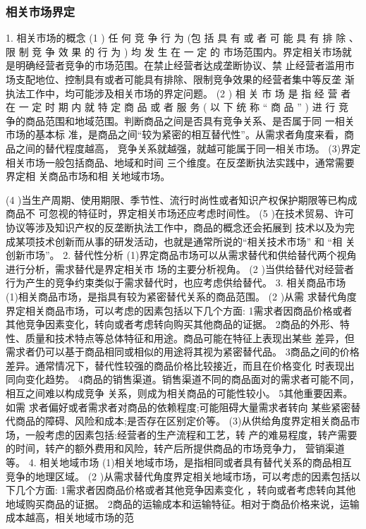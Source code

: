 \documentclass[UTF8,12pt]{ctexart}
\numberwithin{equation}{section} %
\numberwithin{figure}{section}
\numberwithin{table}{section}
\begin{document}
	\subsubsection{相关市场界定}
	1. 相关市场的概念
	(1 ) 任 何 竞 争 行 为 (包 括 具 有 或 者 可 能 具 有 排 除 、 限 制 竞 争 效 果 的 行 为 ) 均 发 生 在 一 定 的
	市场范围内。界定相关市场就是明确经营者竞争的市场范围。在禁止经营者达成垄断协议、禁
	止经营者滥用市场支配地位、控制具有或者可能具有排除、限制竞争效果的经营者集中等反垄
	渐执法工作中，均可能涉及相关市场的界定问题。
	(2 ) 相 关 市 场 是 指 经 营 者 在 一 定 时 期 内 就 特 定 商 品 或 者 服 务 ( 以 下 统 称 “ 商 品 ” ) 进 行 竞
	争的商品范围和地域范围。判断商品之间是否具有竞争关系、是否属于同 一相关市场的基本标
	准，是商品之间“较为紧密的相互替代性”。从需求者角度来看，商品之间的替代程度越高，
	竞争关系就越强，就越可能属于同一相关市场。
	(3)界定相关市场一般包括商品、地域和时间 三个维度。在反垄断执法实践中，通常需要
	界定相 关商品市场和相 关地域市场。
	
	
	(4 )当生产周期、使用期限、季节性、流行时尚性或者知识产权保护期限等已构成商品不
	可忽视的特征时，界定相关市场还应考虑时间性。
	(5 )在技术贸易、许可协议等涉及知识产权的反垄断执法工作中，商品的概念还会拓展到
	技术以及为完成某项技术创新而从事的研发活动，也就是通常所说的“相关技术市场” 和 “相
	关创新市场”。
	2. 替代性分析
	(1)界定商品市场可以从需求替代和供给替代两个视角进行分析，需求替代是界定相关市
	场的主要分析视角。
	(2 )当供给替代对经营者行为产生的竞争约束类似于需求替代时，也应考虑供给替代。
	3. 相关商品市场
	(1)相关商品市场，是指具有较为紧密替代关系的商品范围。
	(2 )从需 求替代角度界定相关商品市场，可以考虑的因素包括以下几个方面:
	1需求者因商品价格或者其他竞争因素变化，转向或者考虑转向购买其他商品的证据。
	2商品的外形、特性、质量和技术特点等总体特征和用途。商品可能在特征上表现出某些
	差异，但需求者仍可以基于商品相同或相似的用途将其视为紧密替代品。
	3商品之间的价格差异。通常情况下，替代性较强的商品价格比较接近，而且在价格变化
	时表现出同向变化趋势。
	4商品的销售渠道。销售渠道不同的商品面对的需求者可能不同，相互之间难以构成竞争
	关系，则成为相关商品的可能性较小。
	5其他重要因素。如需 求者偏好或者需求者对商品的依赖程度;可能阻碍大量需求者转向
	某些紧密替代商品的障碍、风险和成本;是否存在区别定价等。
	(3)从供给角度界定相关商品市场，一般考虑的因素包括:经营者的生产流程和工艺，转
	产的难易程度，转产需要的时间，转产的额外费用和风险，转产后所提供商品的市场竞争力，
	营销渠道等。
	4. 相关地域市场
	(1)相关地域市场，是指相同或者具有替代关系的商品相互竞争的地理区域。
	(2 )从需求替代角度界定相关地域市场，可以考虑的因素包括以下几个方面:
	1需求者因商品价格或者其他竞争因素变化 ，转向或者考虑转向其他地域购买商品的证据。
	2商品的运输成本和运输特征。相对于商品价格来说，运输成本越高，相关地域市场的范
	
\end{document}
